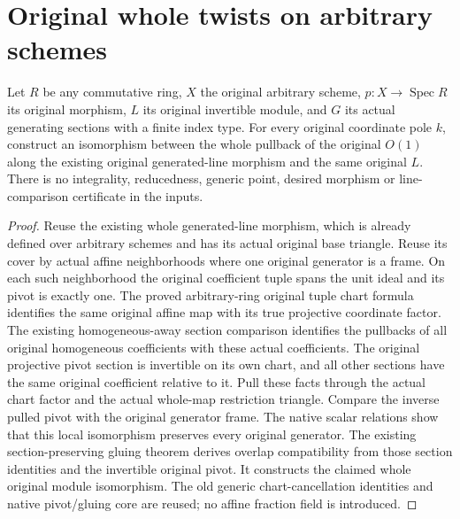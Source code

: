 \section{Original whole twists on arbitrary schemes}

\begin{definition}
\label{def:general-generated-line-actual-original-whole-twist-iso}
\leanok
Let $R$ be any commutative ring, $X$ the original arbitrary scheme,
$p:X\to\operatorname{Spec}R$ its original morphism, $L$ its original
invertible module, and $G$ its actual generating sections with a finite
index type. For every original coordinate pole $k$, construct an
isomorphism between the whole pullback of the original $O(1)$ along
the existing original generated-line morphism and the same original $L$.
There is no integrality, reducedness, generic point, desired morphism
or line-comparison certificate in the inputs.
\end{definition}
\begin{proof}
Reuse the existing whole generated-line morphism, which is already
defined over arbitrary schemes and has its actual original base
triangle. Reuse its cover by actual affine neighborhoods where one
original generator is a frame. On each such neighborhood the original
coefficient tuple spans the unit ideal and its pivot is exactly one.
The proved arbitrary-ring original tuple chart formula identifies the
same original affine map with its true projective coordinate factor.
The existing homogeneous-away section comparison identifies the
pullbacks of all original homogeneous coefficients with these actual
coefficients. The original projective pivot section is invertible on
its own chart, and all other sections have the same original coefficient
relative to it. Pull these facts through the actual chart factor and
the actual whole-map restriction triangle. Compare the inverse pulled
pivot with the original generator frame. The native scalar relations
show that this local isomorphism preserves every original generator.
The existing section-preserving gluing theorem derives overlap
compatibility from those section identities and the invertible original
pivot. It constructs the claimed whole original module isomorphism.
The old generic chart-cancellation identities and native pivot/gluing
core are reused; no affine fraction field is introduced.
\end{proof}

